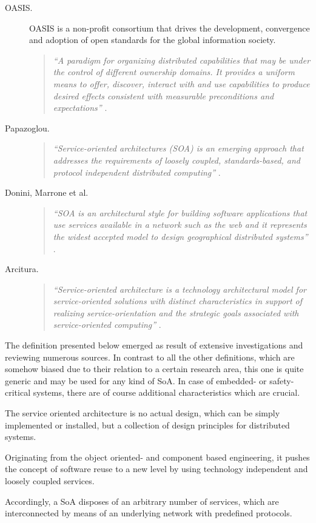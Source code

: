 \begin{description}
	\item [OASIS.]
	OASIS is a non-profit consortium that drives the development, convergence and adoption of open standards for the global information society.
	\begin{quote}
	\emph{``A paradigm for organizing distributed capabilities that may be under the control of different ownership domains. It provides a uniform means to offer, discover, interact with and use capabilities to produce desired effects consistent with measurable preconditions and expectations''} \cite{oasis2006}.
	\end{quote}

	\item [Papazoglou.]
	\begin{quote}
	\emph{``Service-oriented architectures (SOA) is an emerging approach that addresses the requirements of loosely coupled, standards-based, and protocol independent distributed computing''} \cite{papazoglou2007}.
	\end{quote}

	\item [Donini, Marrone et al.]
	\begin{quote}
	\emph{``SOA is an architectural style for building software applications that use services available in a network such as the web and it represents the widest accepted model to design geographical distributed systems''} \cite{donini2008}.
	\end{quote}

	\item [Arcitura.]
	\begin{quote}
	\emph{``Service-oriented architecture is a technology architectural model for service-oriented solutions with distinct characteristics in support of realizing service-orientation and the strategic goals associated with service-oriented computing''} \cite{arcitura}.
	\end{quote}
\end{description}

The definition presented below emerged as result of extensive investigations and reviewing numerous sources. In contrast to all the other definitions, which are somehow biased due to their relation to a certain research area, this one is quite generic and may be used for any kind of SoA. In case of embedded- or safety-critical systems, there are of course additional characteristics which are crucial.

\begin{myquote}
	The service oriented architecture is no actual design, which can be simply implemented or installed, but a collection of design principles for distributed systems.

	Originating from the object oriented- and component based engineering, it pushes the concept of software reuse to a new level by using technology independent and loosely coupled services.

	Accordingly, a SoA disposes of an arbitrary number of services, which are interconnected by means of an underlying network with predefined protocols.
\end{myquote}

